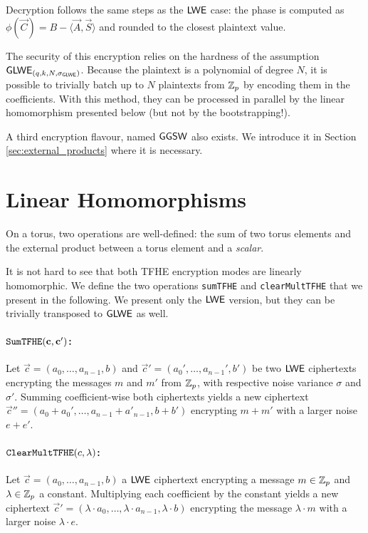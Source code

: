 Decryption follows the same steps as the $\textsf{LWE}$ case: the phase is computed as $\phi(\vec C) = B - \langle \vec A, \vec S \rangle$ and rounded to the closest plaintext value.


The security of this encryption relies on the hardness of the assumption $\textsf{GLWE}_{(q, k, N, \sigma_{\textsf{GLWE}})}$. Because the plaintext is a polynomial of degree $N$, it is possible to trivially batch up to $N$ plaintexts from $\mathbb{Z}_p$ by encoding them in the coefficients. With this method, they can be processed in parallel by the linear homomorphism presented below (but not by the bootstrapping!).
\medskip

A third encryption flavour, named $\textsf{GGSW}$ also exists. We introduce it in Section \ref{sec:external_products} where it is necessary.


\section{Linear Homomorphisms}

On a torus, two operations are well-defined: the sum of two torus elements and the external product between a torus element and a \textit{scalar}.

It is not hard to see that both TFHE encryption modes are linearly homomorphic. We define the two operations \texttt{sumTFHE} and \texttt{clearMultTFHE} that we present in the following. We present only the $\textsf{LWE}$ version, but they can be trivially transposed to $\textsf{GLWE}$ as well.


\paragraph{$\texttt{SumTFHE}(\mathbf c, \mathbf c')$:} Let $\vec c = (a_0, \dots, a_{n-1}, b)$ and $\vec c' = (a_0', \dots, a_{n-1}', b')$ be two $\textsf{LWE}$ ciphertexts encrypting the messages $m$ and $m'$ from $\mathbb{Z}_p$, with respective noise variance $\sigma$ and $\sigma'$. Summing coefficient-wise both ciphertexts yields a new ciphertext $\vec c'' = (a_0 + a_0', \dots, a_{n-1} + a'_{n-1}, b + b')$ encrypting $m + m'$ with a larger noise $e + e'$.


\paragraph{$\texttt{ClearMultTFHE}(c, \lambda)$:} Let $\vec c = (a_0, \dots, a_{n-1}, b)$ a $\textsf{LWE}$ ciphertext encrypting a message $m \in \mathbb{Z}_p$ and $\lambda \in \mathbb{Z}_p$ a constant. Multiplying each coefficient by the constant yields a new ciphertext $\vec c' = (\lambda \cdot a_0, \dots, \lambda \cdot a_{n-1}, \lambda \cdot b)$ encrypting the message $\lambda \cdot m$ with a larger noise $\lambda \cdot e$.


